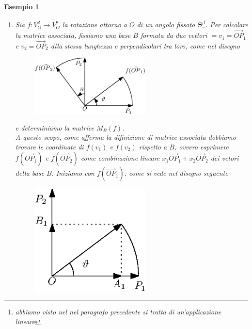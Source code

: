 \documentclass{book}
\newtheorem{esempio}{Esempio}
\begin{document}
\begin{esempio}
  \begin{enumerate}
  \item Sia $f:V_O^2\to V_O^2$ la rotazione attorno a $O$ di un angolo fissato $\Theta$\footnote{abbiamo visto nel
      nel paragrafo precedente si tratta di un'applicazione lineare}. Per calcolare la matrice associata, fissiamo
    una base $B$ formata da due vettori $=v_1=\vec{OP}_1$ e $v_2=\vec{OP}_2$ dlla stessa lunghezza e
    perpendicolari tra loro, come nel disegno
    \begin{figure}[th]
      \centering
        \includegraphics[width=6cm]{img/finiti/imgex4-3-1.eps}
    \end{figure}

    e determiniamo la matrice $M_B(f)$.\\
    A questo scopo, come afferma la difinizione di matrice associata dobbiamo trovare le coordinate di $f(v_1)$ e
    $f(v_2)$ rispetto a $B$, ovvero esprimere $f(\vec{OP}_1)$ e $f(\vec{OP}_2)$ come combinazione lineare
    $x_1\vec{OP}_1+x_2\vec{OP}_2$ dei vetori della base $B$. Iniziamo con $f(\vec{OP}_1)$: come si vede nel
    disegno seguente
    \clearpage
    \begin{figure}[th]
      \centering
        \includegraphics[width=6cm]{img/finiti/imgex4-3-2.eps}
    \end{figure}


\end{enumerate}
\end{esempio}
\end{document}
